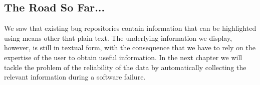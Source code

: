 
\subsection{The Road So Far...}
We saw that existing bug repositories contain information that can be highlighted using means other that plain text.
The underlying information we display, however, is still in textual form, with the consequence that we have to rely on the expertise of the user to obtain useful information.
In the next chapter we will tackle the problem of the reliability of the data by automatically collecting the relevant information during a software failure.





